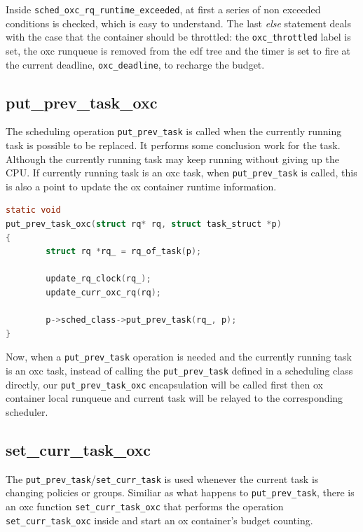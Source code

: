 Inside \texttt{sched\_oxc\_rq\_runtime\_exceeded}, at first
a series of non exceeded conditions is checked, which is 
easy to understand. The last \emph{else} statement deals with
the case that the container should be throttled: the 
\texttt{oxc\_throttled} label is set, the oxc runqueue is removed 
from the edf tree and the timer is set to fire at the current 
deadline, \texttt{oxc\_deadline}, to recharge the budget.

\subsection{put\_prev\_task\_oxc\label{sec:put_prev_task}}

The scheduling operation \texttt{put\_prev\_task} is called when 
the currently running task is possible to be replaced. It performs some 
conclusion work for the task. Although the currently running task may 
keep running without giving up the CPU. If currently running task is an 
oxc task, when \texttt{put\_prev\_task} is called, this is also a point 
to update the ox container runtime information. 

\begin{lstlisting}[language=C, label={lst:put_prev_task_oxc},
		caption={Conclusion work before an oxc task is switched 
				out of a CPU}]
static void 
put_prev_task_oxc(struct rq* rq, struct task_struct *p)
{
        struct rq *rq_ = rq_of_task(p);

        update_rq_clock(rq_);
        update_curr_oxc_rq(rq);

        p->sched_class->put_prev_task(rq_, p);
}
\end{lstlisting}

Now, when a \texttt{put\_prev\_task} operation is needed and the
currently running task is an oxc task, instead of calling the 
\texttt{put\_prev\_task} defined in a scheduling class directly, our
\texttt{put\_prev\_task\_oxc} encapsulation will be called first then
ox container local runqueue and current task will be relayed to
the corresponding scheduler.

\subsection{set\_curr\_task\_oxc\label{sec:set_curr_task_oxc}}
The \texttt{put\_prev\_task}/\texttt{set\_curr\_task} is used whenever
the current task is changing policies or groups. Similiar as what happens 
to \texttt{put\_prev\_task}, there is an oxc function 
\texttt{set\_curr\_task\_oxc} that performs the operation 
\texttt{set\_curr\_task\_oxc} inside and start an ox container's
budget counting.

